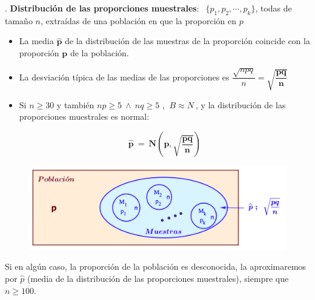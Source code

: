 \begin{theorem}
.	\textbf{Distribución de las proporciones muestrales}: $\ \ \{p_1, p_2, \cdots , p_k\}$, todas de tamaño $n$, extraídas de una población en que la proporción en $p$

\begin{itemize}
\item La media $\boldsymbol{\widehat p}$ de la distribución de las muestras de la proporción coincide con la proporción $\boldsymbol{p}$ de la población.
\item La desviación típica de las medias de las proporciones es $\dfrac{\sqrt{npq}}{n}=\boldsymbol{\sqrt{\dfrac{pq}{n}}}$
\item Si $n\ge 30$ y también $np\ge 5 \ \wedge \ nq\ge 5$ , $\ B \approx N\ $, y la distribución de las proporciones muestrales es normal:

$$\boldsymbol{\widehat p \ = \ N\left( p, \sqrt{\dfrac{pq}{n}} \right) } $$
\end{itemize}

\begin{figure}[H]
	\centering
	\includegraphics[width=.95\textwidth]{imagenes/imagenes05/T05IM09.png}
	\end{figure}

\end{theorem}

\vspace{4mm}
\begin{destacado}
	Si en algún caso, la proporción de la población es desconocida, la aproximaremos por $\widehat p$ (media de la distribución de las proporciones muestrales), siempre que $n\ge 100$.
\end{destacado}


